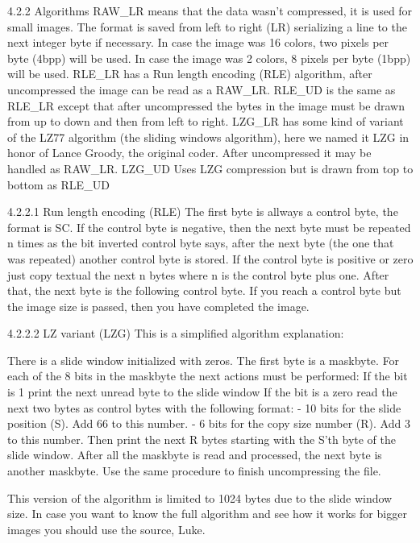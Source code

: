 4.2.2 Algorithms
 RAW_LR means that the data wasn't compressed, it is used for small images.
        The format is saved from left to right (LR) serializing a line to
        the next integer byte if necessary. In case the image was 16 colors,
        two pixels per byte (4bpp) will be used. In case the image was 2
        colors, 8 pixels per byte (1bpp) will be used.
 RLE_LR has a Run length encoding (RLE) algorithm, after uncompressed the
        image can be read as a RAW_LR.
 RLE_UD is the same as RLE_LR except that after uncompressed the bytes in
 				the image must be drawn from up to down and then from left to right.
 LZG_LR has some kind of variant of the LZ77 algorithm (the sliding windows
        algorithm), here we named it LZG in honor of Lance Groody, the
        original coder.
        After uncompressed it may be handled as RAW_LR.
 LZG_UD Uses LZG compression but is drawn from top to bottom as RLE_UD

4.2.2.1 Run length encoding (RLE)
 The first byte is allways a control byte, the format is SC. If the control
 byte is negative, then the next byte must be repeated n times as the bit
 inverted control byte says, after the next byte (the one that was repeated)
 another control byte is stored.
 If the control byte is positive or zero just copy textual the next n bytes
 where n is the control byte plus one. After that, the next byte is the
 following control byte.
 If you reach a control byte but the image size is passed, then you have
 completed the image.

4.2.2.2 LZ variant (LZG)
 This is a simplified algorithm explanation:

 There is a slide window initialized with zeros.
 The first byte is a maskbyte.
 For each of the 8 bits in the maskbyte the next actions must be performed:
  If the bit is 1 print the next unread byte to the slide window
  If the bit is a zero read the next two bytes as control bytes with the
  following format:
   - 10 bits for the slide position (S). Add 66 to this number.
   - 6 bits for the copy size number (R). Add 3 to this number.
   Then print the next R bytes starting with the S'th byte of the slide
   window.
 After all the maskbyte is read and processed, the next byte is another
 maskbyte. Use the same procedure to finish uncompressing the file.

 This version of the algorithm is limited to 1024 bytes due to the slide
 window size. In case you want to know the full algorithm and see how it
 works for bigger images you should use the source, Luke.

